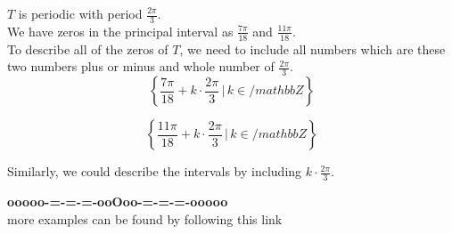 \documentclass{ximera}
\begin{document}
$T$ is periodic with period $\frac{2\pi}{3}$. \\



We have zeros in the principal interval as $\frac{7\pi}{18}$ and $\frac{11\pi}{18}$. \\


To describe all of the zeros of $T$, we need to include all numbers which are these two numbers plus or minus and whole number of $\frac{2\pi}{3}$. \\



\[
\left\{  \frac{7\pi}{18} + k  \cdot \frac{2\pi}{3}  \, | \,  k \in /mathbb{Z}         \right\}
\]



\[
\left\{  \frac{11\pi}{18} + k  \cdot \frac{2\pi}{3}  \, | \,  k \in /mathbb{Z}         \right\}
\]




Similarly, we could describe the intervals by including $k  \cdot \frac{2\pi}{3} $. \\














\begin{center}
\textbf{\textcolor{green!50!black}{ooooo-=-=-=-ooOoo-=-=-=-ooooo}} \\

more examples can be found by following this link\\ 

\end{center}
\end{document}
